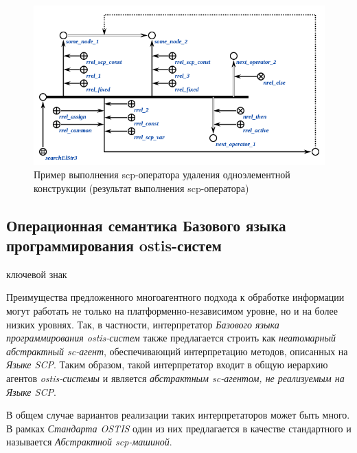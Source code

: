 \begin{figure}[H]
	\centering
	\includegraphics[scale=0.8]{images/part3/chapter_situation_management/searchElStr3_faf_2.png}
	\caption{Пример выполнения scp-оператора удаления одноэлементной конструкции (результат выполнения scp-оператора)}
	\label{fig:erase_edge_2}
\end{figure}

\subsection{Операционная семантика Базового языка программирования ostis-систем}
\label{subsec_scp_oper}

\begin{SCn}
\begin{scnrelfromlist}{ключевой знак}
\end{scnrelfromlist}
\end{SCn}

Преимущества предложенного многоагентного подхода к обработке информации могут работать не только на платформенно-независимом уровне, но и на более низких уровнях. Так, в частности, интерпретатор \textit{Базового языка программирования ostis-систем} также предлагается строить как \textit{неатомарный абстрактный sc-агент}, обеспечивающий интерпретацию методов, описанных на \textit{Языке SCP}. Таким образом, такой интерпретатор входит в общую иерархию агентов \textit{ostis-системы} и является \textit{абстрактным sc-агентом, не реализуемым на Языке SCP}.

В общем случае вариантов реализации таких интерпретаторов может быть много. В рамках \textit{Стандарта OSTIS} один из них предлагается в качестве стандартного и называется \textit{Абстрактной scp-машиной}.

